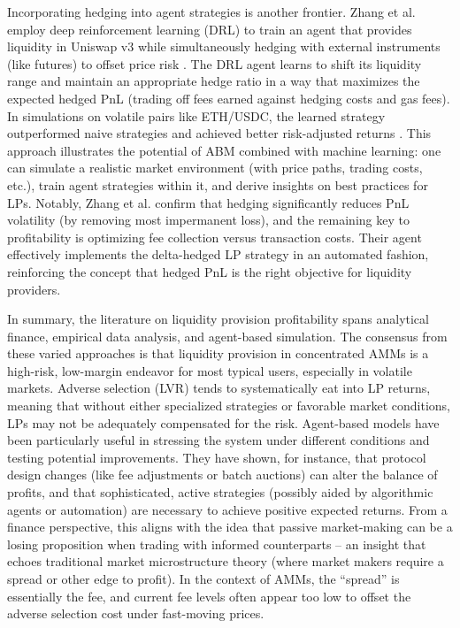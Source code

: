\documentclass[11pt]{article}
\begin{document}
Incorporating hedging into agent strategies is another frontier. Zhang et al. \cite{zhang2023} employ deep reinforcement learning (DRL) to train an agent that provides liquidity in Uniswap v3 while simultaneously hedging with external instruments (like futures) to offset price risk . The DRL agent learns to shift its liquidity range and maintain an appropriate hedge ratio in a way that maximizes the expected hedged PnL (trading off fees earned against hedging costs and gas fees). In simulations on volatile pairs like ETH/USDC, the learned strategy outperformed naive strategies and achieved better risk-adjusted returns \cite{zhang2023}. This approach illustrates the potential of ABM combined with machine learning: one can simulate a realistic market environment (with price paths, trading costs, etc.), train agent strategies within it, and derive insights on best practices for LPs. Notably, Zhang et al. confirm that hedging significantly reduces PnL volatility (by removing most impermanent loss), and the remaining key to profitability is optimizing fee collection versus transaction costs. Their agent effectively implements the delta-hedged LP strategy in an automated fashion, reinforcing the concept that hedged PnL is the right objective for liquidity providers.

In summary, the literature on liquidity provision profitability spans analytical finance, empirical data analysis, and agent-based simulation. The consensus from these varied approaches is that liquidity provision in concentrated AMMs is a high-risk, low-margin endeavor for most typical users, especially in volatile markets. Adverse selection (LVR) tends to systematically eat into LP returns, meaning that without either specialized strategies or favorable market conditions, LPs may not be adequately compensated for the risk. Agent-based models have been particularly useful in stressing the system under different conditions and testing potential improvements. They have shown, for instance, that protocol design changes (like fee adjustments or batch auctions) can alter the balance of profits, and that sophisticated, active strategies (possibly aided by algorithmic agents or automation) are necessary to achieve positive expected returns. From a finance perspective, this aligns with the idea that passive market-making can be a losing proposition when trading with informed counterparts – an insight that echoes traditional market microstructure theory (where market makers require a spread or other edge to profit). In the context of AMMs, the “spread” is essentially the fee, and current fee levels often appear too low to offset the adverse selection cost under fast-moving prices.
\end{document}
